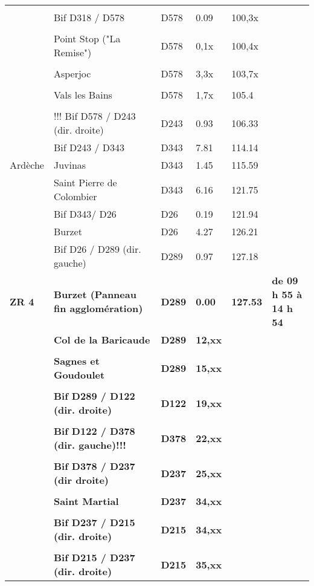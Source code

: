 \documentclass{article}%
\begin{document}
\begin{longtable}{p{2.25cm}|p{6.7cm}|p{2.0cm}|p{1.5cm}|p{1.5cm}|p{3.5cm}}
 & & & & & \\%
 &Bif D318 / D578 &D578&0.09&100,3x& \\%
 & & & & & \\%
 &Point Stop  ("La Remise")&D578 &0,1x&100,4x& \\%
 & & & & & \\%
 &Asperjoc&D578&3,3x&103,7x& \\%
 & & & & & \\%
 &Vals les Bains&D578&1,7x&105.4& \\%
 & & & & & \\%
 &!!! Bif D578 / D243 (dir. droite)&D243&0.93&106.33& \\%
 &Bif D243 / D343&D343&7.81&114.14& \\%
Ardèche&Juvinas&D343&1.45&115.59& \\%
 &Saint Pierre de Colombier&D343&6.16&121.75& \\%
 &Bif D343/ D26&D26&0.19&121.94& \\%
 &Burzet&D26 &4.27&126.21& \\%
 &Bif D26 / D289 (dir. gauche)&D289&0.97&127.18& \\%
\textbf{ZR 4}&\textbf{Burzet (Panneau fin agglomération)}&\textbf{D289}&\textbf{0.00}&\textbf{127.53}&\textbf{de 09 h 55 à 14 h 54}\\%
 &\textbf{Col de la Baricaude}&\textbf{D289}&\textbf{12,xx}& & \\%
 & & & & & \\%
 &\textbf{Sagnes et Goudoulet  }&\textbf{D289}&\textbf{15,xx}& & \\%
 & & & & & \\%
 &\textbf{Bif D289 / D122 (dir. droite)}&\textbf{D122}&\textbf{19,xx}& & \\%
 & & & & & \\%
 &\textbf{Bif D122 / D378 (dir. gauche)!!!}&\textbf{D378 }&\textbf{22,xx}& & \\%
 & & & & & \\%
 &\textbf{Bif D378 / D237 (dir droite)}&\textbf{D237}&\textbf{25,xx}& & \\%
 & & & & & \\%
 &\textbf{Saint Martial }&\textbf{D237}&\textbf{34,xx}& & \\%
 & & & & & \\%
 &\textbf{Bif D237 / D215 (dir. droite)}&\textbf{D215}&\textbf{34,xx}& & \\%
 & & & & & \\%
 &\textbf{Bif D215 / D237 (dir. droite)}&\textbf{D215}&\textbf{35,xx}& & \\%

\end{longtable}
\end{document}
